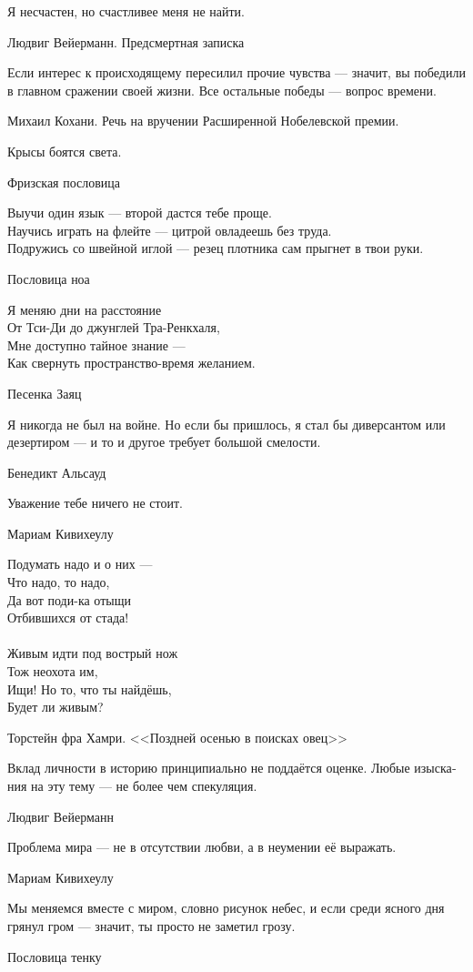 \documentclass[a4paper,12pt,fleqn]{book}\usepackage{polyglossia}\setdefaultlanguage[babelshorthands=true]{russian}\setotherlanguage{english}\defaultfontfeatures{Ligatures=TeX,Mapping=tex-text}\usepackage{xcolor}\newcommand{\ml}[3]{#2}
\begin{document}
{\epigraph
{Я несчастен, но счастливее меня не найти.}
{Людвиг Вейерманн.
Предсмертная записка}

\epigraph
{Если интерес к происходящему пересилил прочие чувства --- значит, вы победили в главном сражении своей жизни.
Все остальные победы --- вопрос времени.}
{Михаил Кохани.
Речь на вручении Расширенной Нобелевской премии.}

\epigraph
{Крысы боятся света.}
{Фризская пословица}

\epigraph
{Выучи один язык --- второй дастся тебе проще.\\
Научись играть на флейте --- цитрой овладеешь без труда.\\
Подружись со швейной иглой --- резец плотника сам прыгнет в твои руки.}
{Пословица ноа}

\epigraph
{Я меняю дни на расстояние\\
От Тси-Ди до джунглей Тра-Ренкхаля,\\
Мне доступно тайное знание ---\\
Как свернуть пространство-время желанием.}
{Песенка Заяц}

\epigraph
{Я никогда не был на войне.
Но если бы пришлось, я стал бы диверсантом или дезертиром --- и то и другое требует большой смелости.}
{Бенедикт Альсауд}

\epigraph{
\ml{$0$}
{Уважение тебе ничего не стоит.}
{Respect costs you nothing.}
}{Мариам Кивихеулу}

\epigraph
{Подумать надо и о них ---\\
Что надо, то надо,\\
Да вот поди-ка отыщи\\
Отбившихся от стада!\\
~\\
Живым идти под вострый нож\\
Тож неохота им,\\
Ищи! Но то, что ты найдёшь,\\
Будет ли живым?}
{Торстейн фра Хамри.
<<Поздней осенью в поисках овец>>}

\epigraph
{Вклад личности в историю принципиально не поддаётся оценке.
Любые изыскания на эту тему --- не более чем спекуляция.}
{Людвиг Вейерманн}

\epigraph
{Проблема мира --- не в отсутствии любви, а в неумении её выражать.}
{Мариам Кивихеулу}

\epigraph
{Мы меняемся вместе с миром, словно рисунок небес, и если среди ясного дня грянул гром --- значит, ты просто не заметил грозу.}
{Пословица тенку}

}
\end{document}
